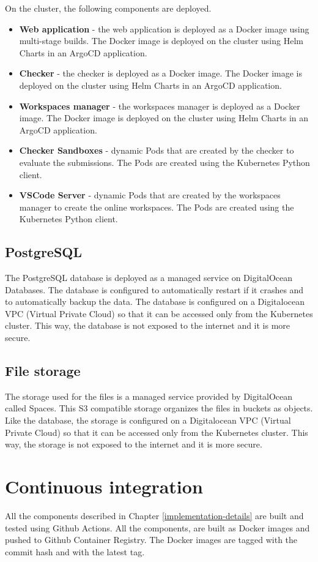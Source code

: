 \documentclass[12pt,a4paper]{report}
\begin{document}
On the cluster, the following components are deployed.

\begin{itemize}
	\item \textbf{Web application} - the web application is deployed as a Docker image using multi-stage builds. The Docker image is deployed on the cluster using Helm Charts in an ArgoCD application.
	\item \textbf{Checker} - the checker is deployed as a Docker image. The Docker image is deployed on the cluster using Helm Charts in an ArgoCD application.
	\item \textbf{Workspaces manager} - the workspaces manager is deployed as a Docker image. The Docker image is deployed on the cluster using Helm Charts in an ArgoCD application.
	\item \textbf{Checker Sandboxes} - dynamic Pods that are created by the checker to evaluate the submissions. The Pods are created using the Kubernetes Python client.
	\item \textbf{VSCode Server} - dynamic Pods that are created by the workspaces manager to create the online workspaces. The Pods are created using the Kubernetes Python client.
\end{itemize}

\subsection{PostgreSQL}
The PostgreSQL database is deployed as a managed service on DigitalOcean Databases. The database is configured to automatically restart if it crashes and to automatically backup the data. The database is configured on a Digitalocean VPC (Virtual Private Cloud) so that it can be accessed only from the Kubernetes cluster. This way, the database is not exposed to the internet and it is more secure.

\subsection{File storage}
The storage used for the files is a managed service provided by DigitalOcean called Spaces. This S3 compatible storage organizes the files in buckets as objects. Like the database, the storage is configured on a Digitalocean VPC (Virtual Private Cloud) so that it can be accessed only from the Kubernetes cluster. This way, the storage is not exposed to the internet and it is more secure.


\section{Continuous integration}
All the components described in Chapter \ref{implementation-details} are built and tested using Github Actions. All the components, are built as Docker images and pushed to Github Container Registry. The Docker images are tagged with the commit hash and with the latest tag.
\end{document}
